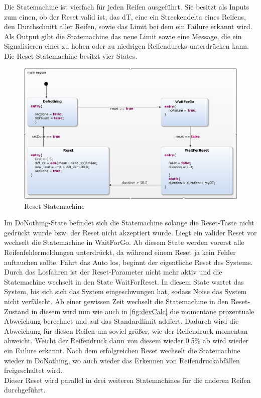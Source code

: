 Die Statemachine ist vierfach für jeden Reifen ausgeführt. Sie besitzt als Inputs zum einen, ob der Reset valid ist, das dT, eine ein Streckendelta eines Reifens, den Durchschnitt aller Reifen, sowie das Limit bei dem ein Failure erkannt wird. Als Output gibt die Statemachine das neue Limit sowie eine Message, die ein Signalisieren eines zu hohen oder zu niedrigen Reifendurcks unterdrücken kann.\\
Die Reset-Statemachine besitzt vier States.
\begin{figure}[H]
	\centering
	\includegraphics[width=1\linewidth]{../Graphiken/ResetStateMachine.png}
	\caption{Reset Statemachine}
	\label{fig:ResetStateMachine}
\end{figure}
Im DoNothing-State befindet sich die Statemachine solange die Reset-Taste nicht gedrückt wurde bzw. der Reset nicht akzeptiert wurde. Liegt ein valider Reset vor wechselt die Statemachine in WaitForGo. Ab diesem State werden vorerst alle Reifenfehlermeldungen unterdrückt, da während einem Reset ja kein Fehler auftauchen sollte. Fährt das Auto los, beginnt der eigentliche Reset des Systems. Durch das Losfahren ist der Reset-Parameter nicht mehr aktiv und die Statemachine wechselt in den State WaitForReset. In diesem State wartet das System, bis sich sich das System eingeschwungen hat, sodass Noise das System nicht verfälscht. Ab einer gewissen Zeit wechselt die Statemachine in den Reset-Zustand in diesem wird nun wie auch in \autoref{fig:devCalc} die momentane prozentuale Abweichung berechnet und auf das Standardlimit addiert. Dadurch wird die Abweichung für diesen Reifen um soviel größer, wie der Reifendruck momentan abweicht. Weicht der Reifendruck dann von diesem wieder 0.5\% ab wird wieder ein Failure erkannt. Nach dem erfolgreichen Reset wechselt die Statemachine wieder in DoNothing, wo auch wieder das Erkennen von Reifendruckabfällen freigeschaltet wird.\\
Dieser Reset wird parallel in drei weiteren Statemachines für die anderen Reifen durchgeführt.\\

